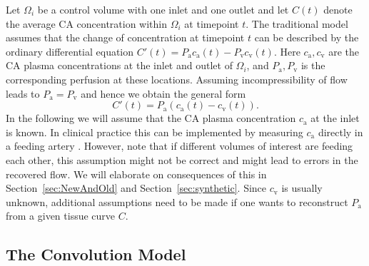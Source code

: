 \documentclass[journal,twocolumn]{IEEEtran}
\newcommand{\ca}{c_\mathrm{a}}
\newcommand{\cout}{c_{\mathrm{v}}}
\newcommand{\Pa}{P_{\mathrm{a}}}
\newcommand{\Pout}{P_{\mathrm{v}}}
\begin{document}
	Let $\Omega_i$ be a control volume with one inlet and one outlet and let $C(t)$ denote the average CA concentration within $\Omega_i$ at timepoint $t$.
	The traditional model assumes that the change of concentration at timepoint $t$ can be described by the ordinary differential equation $C'(t) = \Pa\ca(t) - \Pout\cout(t)$. 
	Here $\ca,\cout$ are the CA plasma concentrations at the inlet and outlet of $\Omega_i$, and $\Pa,\Pout$ is the corresponding perfusion at these locations.
	Assuming incompressibility of flow leads to $\Pa = \Pout$ and hence we obtain the general form
	\begin{equation}
		C'(t) = \Pa\left(\ca(t) - \cout(t)\right).
		\label{eq:classicgeneral}
	\end{equation}	
	In the following we will assume that the CA plasma concentration $\ca$ at the inlet is known.
	In clinical practice this can be implemented by measuring $\ca$ directly in a feeding artery \cite{ostergaard96}.
	However, note that if different volumes of interest are feeding each other, this assumption might not be correct and might lead to errors in the recovered flow.
	We will elaborate on consequences of this in Section~\ref{sec:NewAndOld} and Section~\ref{sec:synthetic}.
	Since $\cout$ is usually unknown, additional assumptions need to be made if one wants to reconstruct $\Pa$ from a given tissue curve $C$.
	
	

	\subsection{The Convolution Model}\label{sec:conv}
	
\end{document}
